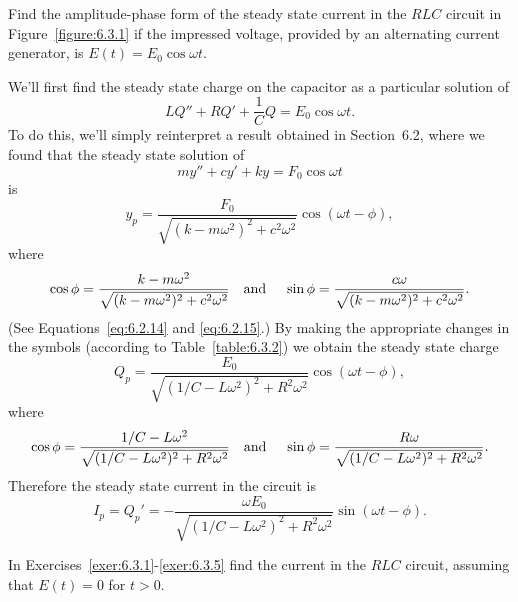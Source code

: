 \begin{example}
  \label{example:6.3.2} \rm Find the amplitude-phase form of the steady state current in the $RLC$
  circuit in Figure~\ref{figure:6.3.1} if the impressed voltage, provided by an alternating current
  generator, is $E(t)=E_{0}\cos\omega t$.
\end{example}

\begin{examplesolution}
\solution We'll first find the steady state charge on the capacitor as a particular solution of
\[
  LQ''+RQ'+\frac{1}{C}Q=E_{0}\cos\omega t.
\]
To do this, we'll simply reinterpret a result obtained in Section~6.2, where we found that the
steady state solution of
\[
  my''+cy'+ky=F_{0}\cos\omega t
\]
is
\[
  y_{p}=\frac{F_{0}}{\sqrt{(k-m\omega^{2})^{2}+c^{2}\omega^{2}}}\cos(\omega t-\phi),
\]
where
\[
  \cos\phi=\frac{k-m\omega^{2}}{\sqrt{(k-m\omega^{2})^{2}+c^{2}\omega^{2}}}\mbox{\quad and \quad}\sin\phi=\frac{c\omega}{\sqrt{(k-m\omega^{2})^{2}+c^{2}\omega^{2}}}.
\]
(See Equations~\eqref{eq:6.2.14} and \eqref{eq:6.2.15}.) By making the appropriate changes in the
symbols (according to Table~\ref{table:6.3.2}) we obtain the steady state charge
\[
  Q_{p}=\frac{E_{0}}{\sqrt{(1/C-L\omega^{2})^{2}+R^{2}\omega^{2}}}\cos(\omega t-\phi),
\]
where
\[
  \cos\phi=\frac{1/C-L\omega^{2}}{\sqrt{(1/C-L\omega^{2})^{2}+R^{2}\omega^{2}}}\mbox{\quad and \quad}\sin\phi=\frac{R\omega}{\sqrt{(1/C-L\omega^{2})^{2}+R^{2}\omega^{2}}}.
\]
Therefore the steady state current in the circuit is
\[
  I_{p}=Q_{p}'= -\frac{\omega E_{0}}{\sqrt{(1/C-L\omega^{2})^{2}+R^{2}\omega^{2}}}\sin(\omega t-\phi).
\]
\end{examplesolution}

\exercises In Exercises~\ref{exer:6.3.1}-\ref{exer:6.3.5} find the current in the $RLC$ circuit, assuming that $E(t)=0$ for $t>0$.

